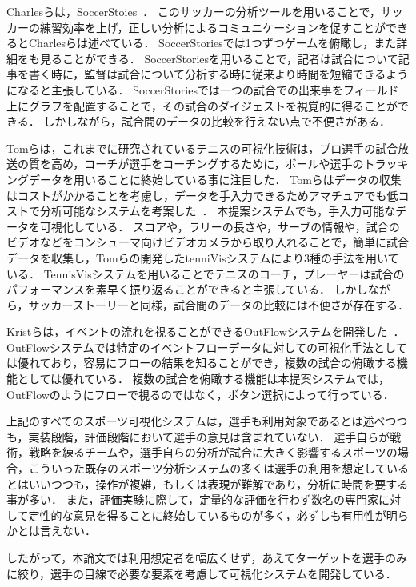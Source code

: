 \documentclass[sotsuron]{kuee}
\begin{document}
	Charlesらは，SoccerStoies~\cite{SoccerStory}．
	このサッカーの分析ツールを用いることで，サッカーの練習効率を上げ，正しい分析によるコミュニケーションを促すことができるとCharlesらは述べている．
	SoccerStoriesでは1つずつゲームを俯瞰し，また詳細をも見ることができる．
	SoccerStoriesを用いることで，記者は試合について記事を書く時に，監督は試合について分析する時に従来より時間を短縮できるようになると主張している．
	SoccerStoriesでは一つの試合での出来事をフィールド上にグラフを配置することで，その試合のダイジェストを視覚的に得ることができる．
	しかしながら，試合間のデータの比較を行えない点で不便さがある．
	
	Tomらは，これまでに研究されているテニスの可視化技術は，プロ選手の試合放送の質を高め，コーチが選手をコーチングするために，ボールや選手のトラッキングデータを用いることに終始している事に注目した．
	Tomらはデータの収集はコストがかかることを考慮し，データを手入力できるためアマチュアでも低コストで分析可能なシステムを考案した~\cite{TenniVis}．
	本提案システムでも，手入力可能なデータを可視化している．
	スコアや，ラリーの長さや，サーブの情報や，試合のビデオなどをコンシューマ向けビデオカメラから取り入れることで，簡単に試合データを収集し，Tomらの開発したtenniVisシステムにより3種の手法を用いている．
	TennisVisシステムを用いることでテニスのコーチ，プレーヤーは試合のパフォーマンスを素早く振り返ることができると主張している．
	しかしながら，サッカーストーリーと同様，試合間のデータの比較には不便さが存在する．
	
	Kristらは，イベントの流れを視ることができるOutFlowシステムを開発した~\cite{Outflow}．
	OutFlowシステムでは特定のイベントフローデータに対しての可視化手法としては優れており，容易にフローの結果を知ることができ，複数の試合の俯瞰する機能としては優れている．
	複数の試合を俯瞰する機能は本提案システムでは，OutFlowのようにフローで視るのではなく，ボタン選択によって行っている．	
	
	上記のすべてのスポーツ可視化システムは，選手も利用対象であるとは述べつつも，実装段階，評価段階において選手の意見は含まれていない．
	選手自らが戦術，戦略を練るチームや，選手自らの分析が試合に大きく影響するスポーツの場合，こういった既存のスポーツ分析システムの多くは選手の利用を想定しているとはいいつつも，操作が複雑，もしくは表現が難解であり，分析に時間を要する事が多い．
	また，評価実験に際して，定量的な評価を行わず数名の専門家に対して定性的な意見を得ることに終始しているものが多く，必ずしも有用性が明らかとは言えない．
	
	したがって，本論文では利用想定者を幅広くせず，あえてターゲットを選手のみに絞り，選手の目線で必要な要素を考慮して可視化システムを開発している．
	
\end{document}
